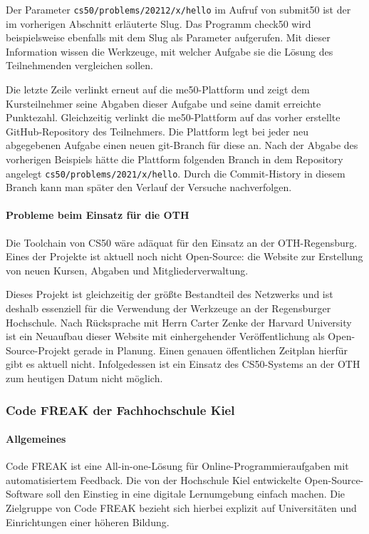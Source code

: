 Der Parameter \texttt{cs50/problems/20212/x/hello} im Aufruf von submit50 ist
der im vorherigen Abschnitt erläuterte Slug. Das Programm check50 wird
beispielsweise ebenfalls mit dem Slug als Parameter aufgerufen. Mit dieser
Information wissen die Werkzeuge, mit welcher Aufgabe sie die Lösung des
Teilnehmenden vergleichen sollen.

Die letzte Zeile verlinkt erneut auf die me50-Plattform und zeigt dem
Kursteilnehmer seine Abgaben dieser Aufgabe und seine damit erreichte
Punktezahl. Gleichzeitig verlinkt die me50-Plattform auf das vorher erstellte
GitHub-Repository des Teilnehmers. Die Plattform legt bei jeder neu abgegebenen
Aufgabe einen neuen git-Branch für diese an. Nach der Abgabe des vorherigen
Beispiels hätte die Plattform folgenden Branch in dem Repository angelegt
\texttt{cs50/problems/2021/x/hello}. Durch die Commit-History in diesem Branch 
kann man später den Verlauf der Versuche nachverfolgen.


\paragraph{Probleme beim Einsatz für die OTH}
Die Toolchain von CS50 wäre adäquat für den Einsatz an der OTH-Regensburg.
Eines der Projekte ist aktuell noch nicht Open-Source: die Website zur
Erstellung von neuen Kursen, Abgaben und Mitgliederverwaltung.

Dieses Projekt ist gleichzeitig der größte Bestandteil des Netzwerks und ist
deshalb essenziell für die Verwendung der Werkzeuge an der Regensburger
Hochschule. Nach Rücksprache mit Herrn Carter Zenke der Harvard University ist
ein Neuaufbau dieser Website mit einhergehender Veröffentlichung als
Open-Source-Projekt gerade in Planung. Einen genauen öffentlichen Zeitplan
hierfür gibt es aktuell nicht. Infolgedessen ist ein Einsatz des CS50-Systems an
der OTH zum heutigen Datum nicht möglich.

\newpage
\subsubsection{Code FREAK der Fachhochschule Kiel}\label{code-freak}
\paragraph{Allgemeines}
Code FREAK ist eine All-in-one-Lösung für Online-Programmieraufgaben mit
automatisiertem Feedback. Die von der Hochschule Kiel entwickelte
Open-Source-Software soll den Einstieg in eine digitale Lernumgebung einfach
machen. Die Zielgruppe von Code FREAK bezieht sich hierbei explizit auf
Universitäten und Einrichtungen einer höheren Bildung.
\parencite{codefreak-startseite}

